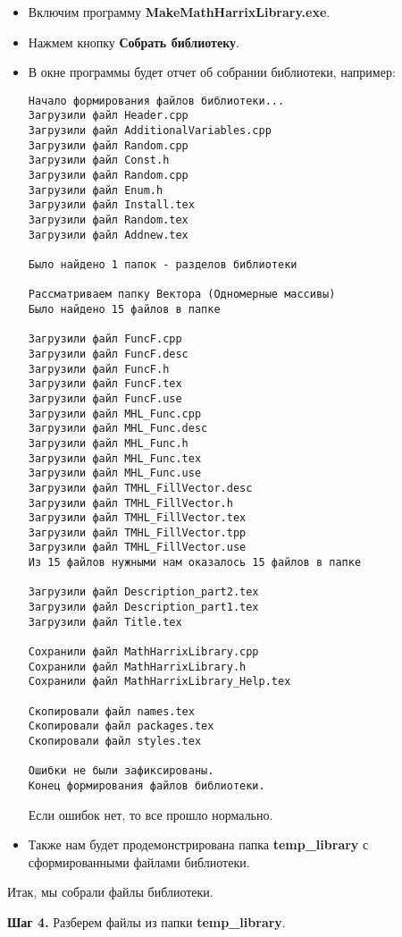 \begin{itemize}
\item Включим программу \textbf{MakeMathHarrixLibrary.exe}.
\item Нажмем кнопку \textbf{Собрать библиотеку}.
\item В окне программы будет отчет об собрании библиотеки, например:
\begin{lstlisting}[label=examplereport, caption=Пример отчета о сборке библиотеки]
Начало формирования файлов библиотеки...
Загрузили файл Header.cpp
Загрузили файл AdditionalVariables.cpp
Загрузили файл Random.cpp
Загрузили файл Const.h
Загрузили файл Random.cpp
Загрузили файл Enum.h
Загрузили файл Install.tex
Загрузили файл Random.tex
Загрузили файл Addnew.tex

Было найдено 1 папок - разделов библиотеки

Рассматриваем папку Вектора (Одномерные массивы)
Было найдено 15 файлов в папке

Загрузили файл FuncF.cpp
Загрузили файл FuncF.desc
Загрузили файл FuncF.h
Загрузили файл FuncF.tex
Загрузили файл FuncF.use
Загрузили файл MHL_Func.cpp
Загрузили файл MHL_Func.desc
Загрузили файл MHL_Func.h
Загрузили файл MHL_Func.tex
Загрузили файл MHL_Func.use
Загрузили файл TMHL_FillVector.desc
Загрузили файл TMHL_FillVector.h
Загрузили файл TMHL_FillVector.tex
Загрузили файл TMHL_FillVector.tpp
Загрузили файл TMHL_FillVector.use
Из 15 файлов нужными нам оказалось 15 файлов в папке

Загрузили файл Description_part2.tex
Загрузили файл Description_part1.tex
Загрузили файл Title.tex

Сохранили файл MathHarrixLibrary.cpp
Сохранили файл MathHarrixLibrary.h
Сохранили файл MathHarrixLibrary_Help.tex

Скопировали файл names.tex
Скопировали файл packages.tex
Скопировали файл styles.tex

Ошибки не были зафиксированы.
Конец формирования файлов библиотеки.
\end{lstlisting}

Если ошибок нет, то все прошло нормально.
\item Также нам будет продемонстрирована папка \textbf{temp\_library} с сформированными файлами библиотеки.
\end{itemize}

Итак, мы собрали файлы библиотеки.

\textbf{Шаг 4.}\label{step4} Разберем файлы из папки \textbf{temp\_library}.

